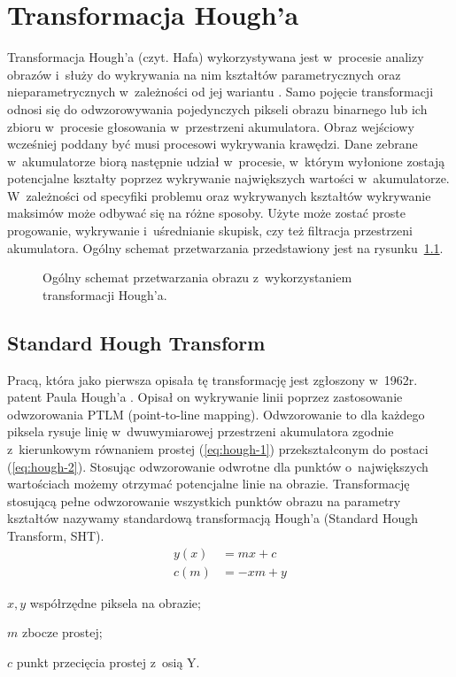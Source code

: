 \chapter{Transformacja Hough'a}
\label{sec:hough}

Transformacja Hough'a (czyt. Hafa) wykorzystywana jest w~procesie analizy obrazów i~służy do wykrywania na nim kształtów parametrycznych oraz nieparametrycznych w~zależności od jej wariantu \cite{mukhopadhyay2015survey}. Samo pojęcie transformacji odnosi się do odwzorowywania pojedynczych pikseli obrazu binarnego lub ich zbioru w~procesie głosowania w~przestrzeni akumulatora. Obraz wejściowy wcześniej poddany być musi procesowi wykrywania krawędzi. Dane zebrane w~akumulatorze biorą następnie udział w~procesie, w~którym wyłonione zostają potencjalne kształty poprzez wykrywanie największych wartości w~akumulatorze. W~zależności od specyfiki problemu oraz wykrywanych kształtów wykrywanie maksimów może odbywać się na różne sposoby. Użyte może zostać proste progowanie, wykrywanie i~uśrednianie skupisk, czy też filtracja przestrzeni akumulatora. Ogólny schemat przetwarzania przedstawiony jest na rysunku~\ref{fig:hough}.

\begin{figure}
    \centering
    
    \caption{Ogólny schemat przetwarzania obrazu z~wykorzystaniem transformacji Hough'a.}
    \label{fig:hough}
\end{figure}

\section{Standard Hough Transform}

Pracą, która jako pierwsza opisała tę transformację jest zgłoszony w~1962r. patent Paula Hough'a \cite{hough1962method}. Opisał on wykrywanie linii poprzez zastosowanie odwzorowania PTLM (point-to-line mapping). Odwzorowanie to dla każdego piksela rysuje linię w~dwuwymiarowej przestrzeni akumulatora zgodnie z~kierunkowym równaniem prostej (\ref{eq:hough-1}) przekształconym do postaci (\ref{eq:hough-2}). Stosując odwzorowanie odwrotne dla punktów o~największych wartościach możemy otrzymać potencjalne linie na obrazie. Transformację stosującą pełne odwzorowanie wszystkich punktów obrazu na parametry kształtów nazywamy standardową transformacją Hough'a (Standard Hough Transform, SHT).
\begin{align}
    y(x) &= mx+c \label{eq:hough-1}\\
    c(m) &= -xm+y \label{eq:hough-2}
\end{align}
\begin{eqexpl}
    \item{$x, y$} współrzędne piksela na obrazie;
    \item{$m$} zbocze prostej;
    \item{$c$} punkt przecięcia prostej z~osią Y.
\end{eqexpl}

